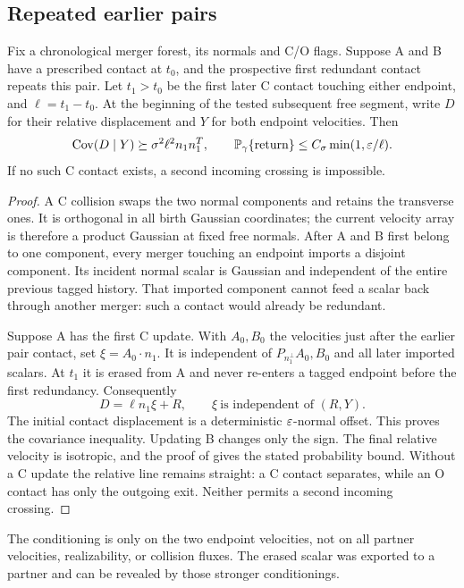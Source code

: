 \subsection{Repeated earlier pairs}
\begin{lemma}\label{lem:repeated}
Fix a chronological merger forest, its normals and C/O flags.
Suppose A and B have a prescribed contact at $t_0$, and the prospective
first redundant contact repeats this pair. Let $t_1>t_0$ be the first
later C contact touching either endpoint, and $\ell=t_1-t_0$.
At the beginning of the tested subsequent free segment, write $D$ for
their relative displacement and $Y$ for both endpoint velocities. Then
\[
 \operatorname{Cov}(D\mid Y)\succeq\sigma^2\ell^2 n_1n_1^T,
 \qquad
 \mathbb P_\gamma\{\text{return}\}\leq C_\sigma\min(1,\varepsilon/\ell).
\]
If no such C contact exists, a second incoming crossing is impossible.
\end{lemma}
\begin{proof}
A C collision swaps the two normal components and retains the transverse
ones. It is orthogonal in all birth Gaussian coordinates; the current
velocity array is therefore a product Gaussian at fixed free normals.
After A and B first belong to one component, every merger touching an
endpoint imports a disjoint component. Its incident normal scalar is
Gaussian and independent of the entire previous tagged history.
That imported component cannot feed a scalar back through another merger:
such a contact would already be redundant.

Suppose A has the first C update. With $A_0,B_0$ the velocities just after
the earlier pair contact, set $\xi=A_0\cdot n_1$. It is independent of
$P_{n_1^\perp}A_0,B_0$ and all later imported scalars. At $t_1$ it is
erased from A and never re-enters a tagged endpoint before the first
redundancy. Consequently
\[
 D=\ell n_1\xi+R,\qquad
 \xi\ \text{is independent of }(R,Y).
\]
The initial contact displacement is a deterministic $\varepsilon$-normal
offset. This proves the covariance inequality. Updating B changes only
the sign. The final relative velocity is isotropic, and the proof of
 gives the stated probability bound.
Without a C update the relative line remains straight: a C contact
separates, while an O contact has only the outgoing exit. Neither permits
a second incoming crossing.
\end{proof}

The conditioning is only on the two endpoint velocities, not on all
partner velocities, realizability, or collision fluxes. The erased scalar
was exported to a partner and can be revealed by those stronger
conditionings.

